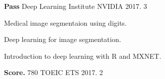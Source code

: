 \begin{cventries}
  \cventry
    {\textbf{Pass}}
    {Deep Learning Institute}
    {NVIDIA}
    {2017. 3}
    {
      \begin{cvitems}
        \item {Medical image segmentaion using digits.}
        \item {Deep learning for image segmentation.}
        \item {Introduction to deep learning with R and MXNET.}
      \end{cvitems}
    }
  \cventry
    {\textbf{Score. } 780}
    {TOEIC}
    {ETS}
    {2017. 2}
    {}
\end{cventries}
